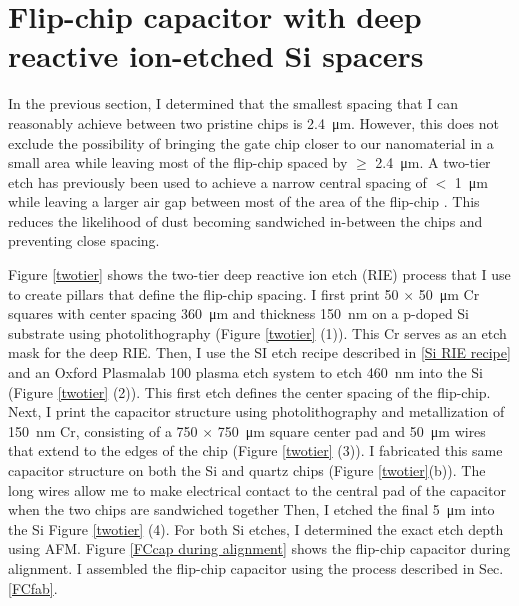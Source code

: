 \documentclass[double,12pt,1in,seploa]{beavtex}
\let\Oldsection\section
\renewcommand{\section}{\FloatBarrier\Oldsection}
\begin{document}
\section{Flip-chip capacitor with deep reactive ion-etched Si spacers} \label{FC SIspacer}
In the previous section, I determined that the smallest spacing that I can reasonably achieve between two pristine chips is \SI{2.4}{\micro\meter}. However, this does not exclude the possibility of bringing the gate chip closer to our nanomaterial in a small area while leaving most of the flip-chip spaced by $\geq$ \SI{2.4}{\micro\meter}. A two-tier etch has previously been used to achieve a narrow central spacing of $<$ \SI{1}{\micro\meter} while leaving a larger air gap between most of the area of the flip-chip \cite{beukman_noninvasive_2015}. This reduces the likelihood of dust becoming sandwiched in-between the chips and preventing close spacing. 

Figure \ref{twotier} shows the two-tier deep reactive ion etch (RIE) process that I use to create pillars that define the flip-chip spacing. I first print 50 $\times$ \SI{50}{\micro\meter} Cr squares with center spacing \SI{360}{\micro\meter} and thickness \SI{150}{\nano\meter} on a p-doped Si substrate using photolithography (Figure \ref{twotier} (1)). This Cr serves as an etch mask for the deep RIE. Then, I use the SI etch recipe described in \ref{Si RIE recipe} and an Oxford Plasmalab 100 plasma etch system to etch \SI{460}{\nano\meter} into the Si (Figure \ref{twotier} (2)). This first etch defines the center spacing of the flip-chip. Next, I print the capacitor structure using photolithography and metallization of \SI{150}{\nano\meter} Cr, consisting of a 750 $\times$ \SI{750}{\micro\meter} square center pad and \SI{50}{\micro\meter} wires that extend to the edges of the chip (Figure \ref{twotier} (3)). I fabricated this same capacitor structure on both the Si and quartz chips (Figure \ref{twotier}(b)). The long wires allow me to make electrical contact to the central pad of the capacitor when the two chips are sandwiched together Then, I etched the final \SI{5}{\micro\meter} into the Si Figure \ref{twotier} (4). For both Si etches, I determined the exact etch depth using AFM. Figure \ref{FCcap during alignment} shows the flip-chip capacitor during alignment. I assembled the flip-chip capacitor using the process described in Sec. \ref{FCfab}. 
 
\end{document}
